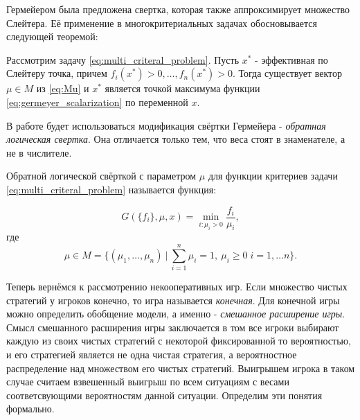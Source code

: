 Гермейером была предложена свертка, которая также аппроксимирует 
множество Слейтера. Её применение в многокритериальных 
задачах обосновывается следующей теоремой:

\begin{Th}
	Рассмотрим задачу \eqref{eq:multi_criteral_problem}.     
    Пусть $x^*$ - эффективная по Слейтеру точка, 
    причем $f_i(x^*)>0, \ldots, f_n(x^*)>0$.
    Тогда существует вектор $\mu \in M$ из \eqref{eq:Mu} 
    и $x^*$ является точкой максимума функции 
    \eqref{eq:germeyer_scalarization} по переменной $x$. 
\end{Th}

В работе будет использоваться модификация свёртки Гермейера -
\textit{обратная логическая свертка}. Она отличается
только тем, что веса стоят в знаменателе, а не в числителе.

\begin{Def}
	Обратной логической свёрткой с параметром $\mu$ для 
	функции критериев задачи \eqref{eq:multi_criteral_problem}
	называется функция:
	
	\begin{equation}
		G(\{f_i\}, \mu, x)=
		\min \limits_{i: \mu_i > 0} \frac{f_i}{\mu_i},
		\label{eq:germeyer_scalarization}	
	\end{equation}
	где
	\begin{equation}
		\mu \in 
		M = \{
			(\mu_1, \ldots, \mu_n) \:
			| \: \sum_{i=1}^n \mu_i = 1, \: 
			  \mu_i \geq 0 \; i = 1, \ldots n 
		\}.
		\label{eq:Mu}	
	\end{equation}
\end{Def}

Теперь вернёмся к рассмотрению некооперативных игр.
Если множество чистых стратегий у игроков конечно, то игра
называется \textit{конечная}. Для конечной игры можно
определить обобщение модели, 
а именно - \textit{смешанное расширение игры}.
Смысл смешанного расширения игры заключается в том
все игроки выбирают каждую из своих чистых стратегий с некоторой
фиксированной то вероятностью, и его стратегией является
не одна чистая стратегия, а вероятностное  распределение над множеством 
его чистых стратегий. Выигрышем игрока в таком случае считаем взвешенный
выигрыш по всем ситуациям с весами соответсвующими вероятностям данной
ситуации. Определим эти понятия формально.

